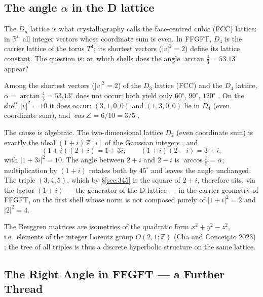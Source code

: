 \subsection{The angle $\alpha$ in the D lattice \BM}
\label{sec:winkel}

The $D_n$ lattice is what crystallography calls the face-centred cubic (FCC)
lattice: in $\mathbb R^n$ all integer vectors whose coordinate sum is even.
In FFGFT, $D_4$ is the carrier lattice of the torus $T^4$; its shortest
vectors ($|v|^2=2$) define its lattice constant. The question is: on which
shells does the angle $\arctan\tfrac43 = 53.13^\circ$ appear?

Among the shortest vectors ($|v|^2=2$) of the $D_3$ lattice (FCC) and the $D_4$
lattice, $\alpha = \arctan\tfrac43 = 53.13^\circ$ does not occur; both yield
only $60^\circ$, $90^\circ$, $120^\circ$ \XM. On the shell $|v|^2 = 10$ it
does occur: $(3,1,0,0)$ and $(1,3,0,0)$ lie in $D_4$ (even coordinate sum), and
$\cos\angle = 6/10 = 3/5$ \BM.

The cause is algebraic. The two-dimensional lattice $D_2$ (even coordinate sum)
is exactly the ideal $(1+i)\,\mathbb Z[i]$ of the Gaussian integers \BM, and
\begin{equation}
  (1+i)(2+i) = 1+3i, \qquad (1+i)(2-i) = 3+i,
\end{equation}
with $|1+3i|^2 = 10$. The angle between $2+i$ and $2-i$ is $\arccos\tfrac35
= \alpha$; multiplication by $(1+i)$ rotates both by $45^\circ$ and leaves
the angle unchanged. The triple $(3,4,5)$, which by §\ref{sec:345} is the
square of $2+i$, therefore sits, via the factor $(1+i)$ --- the generator of
the D lattice --- in the carrier geometry of FFGFT, on the first shell whose
norm is not composed purely of $|1+i|^2=2$ and $|2|^2=4$.

The Berggren matrices are isometries of the quadratic form $x^2+y^2-z^2$, i.e.\
elements of the integer Lorentz group $O(2,1;\mathbb Z)$ (Cha and Conceição
2023) \EM; the tree of all triples is thus a discrete hyperbolic structure on
the same lattice.


\subsection{The Right Angle in FFGFT --- a Further Thread \SM}

